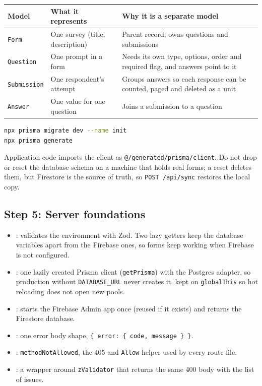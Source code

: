 \documentclass[11pt,a4paper]{article}
\begin{document}
\begin{center}
\begin{tabular}{@{}p{2.6cm}p{5.6cm}p{6.4cm}@{}}
\toprule
\textbf{Model} & \textbf{What it represents} & \textbf{Why it is a separate model}\\
\midrule
\texttt{Form} & One survey (title, description) & Parent record; owns questions and submissions\\
\texttt{Question} & One prompt in a form & Needs its own type, options, order and required flag, and answers point to it\\
\texttt{Submission} & One respondent's attempt & Groups answers so each response can be counted, paged and deleted as a unit\\
\texttt{Answer} & One value for one question & Joins a submission to a question\\
\bottomrule
\end{tabular}
\end{center}
\begin{lstlisting}[language=bash]
npx prisma migrate dev --name init
npx prisma generate
\end{lstlisting}
Application code imports the client as \texttt{@/generated/prisma/client}. Do not drop or reset the database schema on a machine that holds real forms; a reset deletes them, but Firestore is the source of truth, so \texttt{POST /api/sync} restores the local copy.

\subsection*{Step 5: Server foundations}
\begin{itemize}
  \item {}: validates the environment with Zod. Two lazy getters keep the database variables apart from the Firebase ones, so forms keep working when Firebase is not configured.
  \item {}: one lazily created Prisma client (\texttt{getPrisma}) with the Postgres adapter, so production without \texttt{DATABASE\_URL} never creates it, kept on \texttt{globalThis} so hot reloading does not open new pools.
  \item {}: starts the Firebase Admin app once (reused if it exists) and returns the Firestore database.
  \item {}: one error body shape, \texttt{\{ error: \{ code, message \} \}}.
  \item {}: \texttt{methodNotAllowed}, the 405 and \texttt{Allow} helper used by every route file.
  \item {}: a wrapper around \texttt{zValidator} that returns the same 400 body with the list of issues.
\end{itemize}
\end{document}

